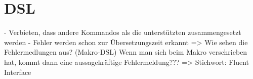 \documentclass
[ 12pt,
  parskip=half %
]{scrreprt}
\begin{document}
\section{DSL}

- Verbieten, dass andere Kommandos als die unterstützten zusammengesetzt werden
- Fehler werden schon zur Übersetzungszeit erkannt
	=> Wie sehen die Fehlermedlungen aus? (Makro-DSL)
		Wenn man sich beim Makro verschrieben hat, kommt dann eine aussagekräftige Fehlermeldung???
=> Stichwort: Fluent Interface

\nocite{*} %
\end{document}
